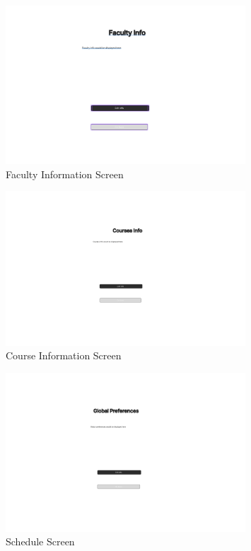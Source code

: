 \documentclass{article}
\begin{document}
\begin{figure}[h]
    \centering
    \includegraphics[width=0.8\textwidth]{photos/photo3.png}
    \caption{Faculty Information Screen}
\end{figure}

\begin{figure}[h]
    \centering
    \includegraphics[width=0.8\textwidth]{photos/photo4.png}
    \caption{Course Information Screen}
\end{figure}

\begin{figure}[h]
    \centering
    \includegraphics[width=0.8\textwidth]{photos/photo5.png}
    \caption{Schedule Screen}
\end{figure}
\end{document}
